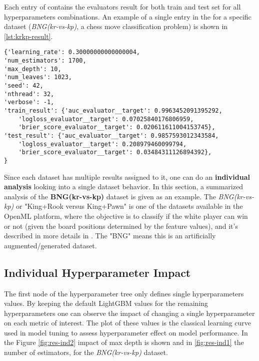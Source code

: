 Each entry of  contains the evaluators result for both train and test set for all hyperparameters combinations. An example of a single entry in the  for a specific dataset (\textit{BNG(kr-vs-kp)}, a chess move classification problem) is shown in \ref{lst:krkp-result}.

\begin{lstlisting}[caption={BNG(kr-vs-kp) experiment result for hyperparam combination (0.3, 1700, 10)}, label={lst:krkp-result}]
{'learning_rate': 0.30000000000000004,
'num_estimators': 1700,
'max_depth': 10,
'num_leaves': 1023,
'seed': 42,
'nthread': 32,
'verbose': -1,
'train_result': {'auc_evaluator__target': 0.9963452091395292,
    'logloss_evaluator__target': 0.07025840176806959,
    'brier_score_evaluator__target': 0.020611611004153745},
'test_result': {'auc_evaluator__target': 0.9857593012343584,
    'logloss_evaluator__target': 0.208979460099794,
    'brier_score_evaluator__target': 0.03484311126894392},
}  \end{lstlisting}


Since each dataset has multiple results assigned to it, one can do an \textbf{individual analysis} looking into a single dataset behavior. In this section, a summarized analysis of the \textbf{BNG(kr-vs-kp)} dataset is given as an example. The \textit{BNG(kr-vs-kp)} or "King+Rook versus King+Pawn" is one of the datasets available in the OpenML platform, where the objective is to classify if the white player can win or not (given the board positions determined by the feature values), and it's described in more details in \cite{shapiro1987structured}. The "BNG" means this is an artificially augmented/generated dataset.

\subsection{Individual Hyperparameter Impact}

The first node of the hyperparameter tree only defines single hyperparameters values. By keeping the default LightGBM values for the remaining hyperparameters one can observe the impact of changing a single hyperparameter on each metric of interest. The plot of these values is the classical learning curve used in model tuning to assess hyperparameter effect on model performance. In the Figure \ref{fig:res-ind2} impact of max depth is shown and in \ref{fig:res-ind1} the number of estimators, for the \textit{BNG(kr-vs-kp)} dataset.


